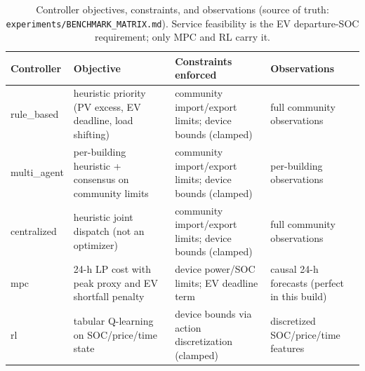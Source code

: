 \documentclass[11pt,a4paper]{article}
\begin{document}
\begin{table}[htbp]
\centering
\caption{Controller objectives, constraints, and observations (source of truth:
\texttt{experiments/BENCHMARK\_MATRIX.md}). Service feasibility is the EV
departure-SOC requirement; only MPC and RL carry it.}
\label{tab:controllers}
\begin{tabular}{p{2.1cm}p{3.4cm}p{3.2cm}p{3.2cm}}
\toprule
Controller & Objective & Constraints enforced & Observations \\
\midrule
rule\_based & heuristic priority (PV excess, EV deadline, load shifting) & community import/export limits; device bounds (clamped) & full community observations \\
multi\_agent & per-building heuristic + consensus on community limits & community import/export limits; device bounds (clamped) & per-building observations \\
centralized & heuristic joint dispatch (not an optimizer) & community import/export limits; device bounds (clamped) & full community observations \\
mpc & 24-h LP cost with peak proxy and EV shortfall penalty & device power/SOC limits; EV deadline term & causal 24-h forecasts (perfect in this build) \\
rl & tabular Q-learning on SOC/price/time state & device bounds via action discretization (clamped) & discretized SOC/price/time features \\
\bottomrule
\end{tabular}
\end{table}
\end{document}
